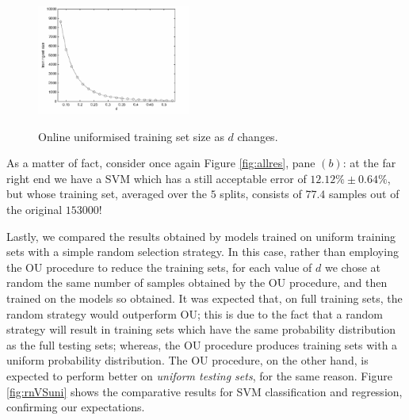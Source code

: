 \begin{figure}[!ht] \centering
  \includegraphics[width=0.45\textwidth]{figs/fig_allSize.eps} \\
  \caption{Online uniformised training set size as $d$ changes.}
  \label{fig:TSsize}
\end{figure}

As a matter of fact, consider once again Figure \ref{fig:allres}, pane
$(b)$: at the far right end we have a SVM which has a still acceptable
error of $12.12\% \pm 0.64\%$, but whose training set, averaged over
the $5$ splits, consists of $77.4$ samples out of the original
$153000$!

Lastly, we compared the results obtained by models trained on uniform
training sets with a simple random selection strategy. In this case,
rather than employing the OU procedure to reduce the training sets,
for each value of $d$ we chose at random the same number of samples
obtained by the OU procedure, and then trained on the models so
obtained. It was expected that, on full training sets, the random
strategy would outperform OU; this is due to the fact that a random
strategy will result in training sets which have the same probability
distribution as the full testing sets; whereas, the OU procedure
produces training sets with a uniform probability distribution. The OU
procedure, on the other hand, is expected to perform better on
\emph{uniform testing sets}, for the same reason. Figure
\ref{fig:rnVSuni} shows the comparative results for SVM classification
and regression, confirming our expectations.

